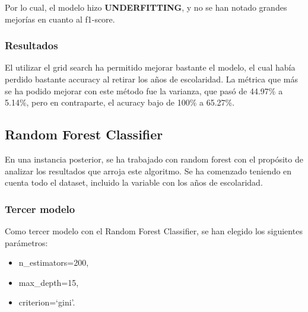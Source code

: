 \documentclass[a4paper]{article}
\begin{document}
            Por lo cual, el modelo hizo \textbf{UNDERFITTING}, y no se han notado grandes mejorías en cuanto al f1-score.

            \subsubsection*{Resultados}

            El utilizar el grid search ha permitido mejorar bastante el modelo, el cual había perdido bastante accuracy al retirar los años de escolaridad. La métrica que más se ha podido mejorar con este método fue la varianza, que pasó de 44.97\% a 5.14\%, pero en contraparte, el acuracy bajo de 100\% a 65.27\%.

    \subsection{Random Forest Classifier}
        
        En una instancia posterior, se ha trabajado con random forest con el propósito de analizar los resultados que arroja este algoritmo. Se ha comenzado teniendo en cuenta todo el dataset, incluido la variable con los años de escolaridad. 

        \subsubsection{Tercer modelo}

            Como tercer modelo con el Random Forest Classifier, se han elegido los siguientes parámetros:
            \begin{itemize}
                \item n\_estimators=200,
                \item max\_depth=15,
                \item criterion=`gini'.
            \end{itemize}
\end{document}
